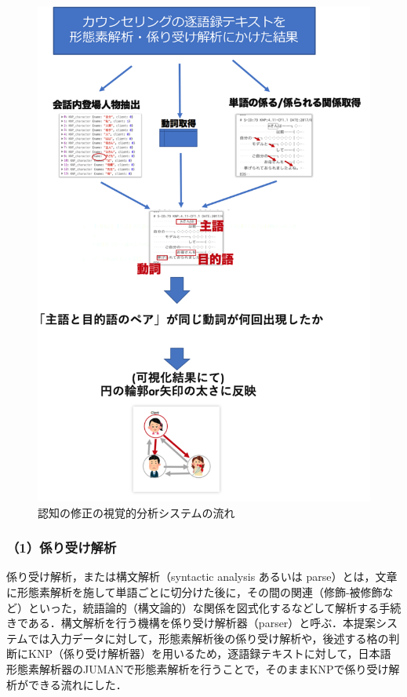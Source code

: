 \documentclass[shuuron]{kuee}
\begin{document}
\begin{figure}
  \begin{center}
    \includegraphics[clip,width=13.0cm]{charaFlow.png}
  \end{center}
  \caption{認知の修正の視覚的分析システムの流れ}
  \label{fig:charaFlow}
\end{figure}





\subsubsection{（1）係り受け解析}


係り受け解析，または構文解析（syntactic analysis あるいは parse）とは，文章に形態素解析を施して単語ごとに切分けた後に，その間の関連（修飾-被修飾など）といった，統語論的（構文論的）な関係を図式化するなどして解析する手続きである．構文解析を行う機構を係り受け解析器（parser）と呼ぶ．本提案システムでは入力データに対して，形態素解析後の係り受け解析や，後述する格の判断にKNP（係り受け解析器）\cite{KNP}を用いるため，逐語録テキストに対して，日本語形態素解析器のJUMAN\cite{juman}で形態素解析を行うことで，そのままKNPで係り受け解析ができる流れにした．
\end{document}
